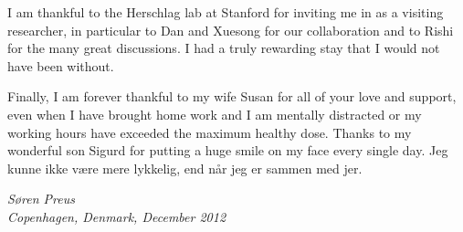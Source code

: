 I am thankful to the Herschlag lab at Stanford for inviting me in as a visiting researcher, in particular to Dan and Xuesong for our collaboration and to Rishi for the many great discussions. I had a truly rewarding stay that I would not have been without.

Finally, I am forever thankful to my wife Susan for all of your love and support, even when I have brought home work and I am mentally distracted or my working hours have exceeded the maximum healthy dose. Thanks to my wonderful son Sigurd for putting a huge smile on my face every single day. Jeg kunne ikke være mere lykkelig, end når jeg er sammen med jer.

\vspace*{3cm}
\begin{center}
\emph{
Søren Preus\\
\vspace*{0.2 cm}
Copenhagen, Denmark, December 2012}
\end{center}
